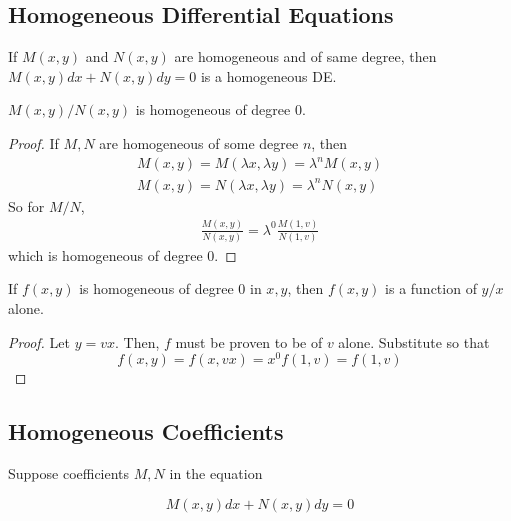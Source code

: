 \subsection{Homogeneous Differential Equations}

\begin{theorem}
    If $M(x,y)$ and $N(x,y)$ are homogeneous and of same degree, then $M(x,y)dx+N(x,y)dy=0$
    is a homogeneous DE.
\end{theorem}
    
\begin{theorem}
    $M(x,y)/N(x,y)$ is homogeneous of degree 0.

    \begin{proof}
        If $M,N$ are homogeneous of some degree $n$, then
        \begin{eqnarray}
            M(x,y)=M(\lambda x,\lambda y)=\lambda ^nM(x,y)\\
            M(x,y)=N(\lambda x,\lambda y)=\lambda ^nN(x,y)
        \end{eqnarray}
        So for $M/N$,
        \begin{eqnarray}
            \frac{M(x,y)}{N(x,y)}=\lambda^0\frac{M(1,v)}{N(1,v)}
        \end{eqnarray}
        which is homogeneous of degree 0.
    \end{proof}
\end{theorem}

\begin{theorem}
    If $f(x,y)$ is homogeneous of degree 0 in $x,y$, then $f(x,y)$ is a function of $y/x$ alone.
    \begin{proof}
        Let $y=vx$. Then, $f$ must be proven to be of $v$ alone. Substitute so that
        \begin{equation}
            f(x,y)=f(x,vx)=x^0f(1,v)=f(1,v)
        \end{equation}
    \end{proof}
\end{theorem}

\subsection{Homogeneous Coefficients}

Suppose coefficients $M,N$ in the equation

\begin{equation}
    M(x,y)dx+N(x,y)dy=0
\end{equation}

